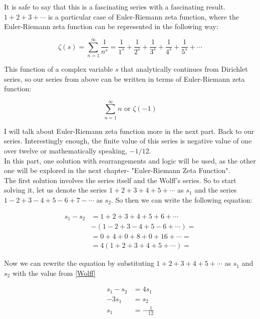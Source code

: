 \documentclass[a4paper]{article}
\begin{document}
It is safe to say that this is a fascinating series with a fascinating
result. \(1+2+3+\cdots\) is a particular case of Euler-Riemann zeta function, where
the Euler-Riemann zeta function can be represented in the following way:

\begin{equation}
  \zeta(s)=\sum_{n=1}^{\infty} \frac{1}{n^s}=\frac{1}{1^s}+\frac{1}{2^s}+\frac{1}{3^s}+\frac{1}{4^s}+\frac{1}{5^s}+\cdots
  \label{zetaf}
\end{equation}

This function of a complex variable \(s\) that analytically continues from
Dirichlet series, so our series from above can be written in terms of
Euler-Riemann zeta function: 

\begin{equation}
  \sum_{n=1}^{\infty} n \text{ or } \zeta(-1)
  \end{equation}

I will talk about Euler-Riemann zeta function more in the next part. Back to our
series. Interestingly enough, the finite value of this series is negative value
of one over twelve or mathematically speaking, \(-1/12\).\\

In this part, one solution with rearrangements and logic will be used, as the
other one will be explored in the next chapter- "Euler-Riemann Zeta
Function".\\

The first solution involves the series itself and the Wolff's series. So to
start solving it, let us denote the series \(1+2+3+4+5+\cdots\) as \(s_1\) and the
series \(1-2+3-4+5-6+7-\cdots\) as \(s_2\). So then we can write the following equation: 

\begin{align*}
  s_1-s_2&=1+2+3+4+5+6+\cdots\\
  &-(1-2+3-4+5-6+\cdots)=\\
  &=0+4+0+8+0+16+\cdots=\\
  &=4(1+2+3+4+5+\cdots)=
\end{align*}

Now we can rewrite the equation by substituting \(1+2+3+4+5+\cdots\) as \(s_1\) and
\(s_2\) with the value from \ref{Wolff}

\begin{align*}
  s_1-s_2&=4s_1\\
  -3s_1&=s_2\\
  s_1&=-\frac{1}{12}\\
  \end{align*}
\end{document}

